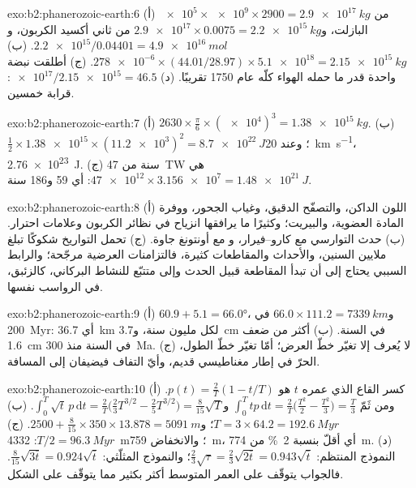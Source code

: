 \begin{solution}{exo:b2:phanerozoic-earth:6}
(أ) $\num{e5} \times \num{e9} \times 2900 = \qty{2.9e17}{kg}$ من البازلت، و$\num{2.9e17}
\times 0.0075 = \qty{2.2e15}{kg}$ من ثاني أكسيد الكربون، و$\num{2.2e15}/0.04401 = \qty{4.9e16}{mol}$.
(ب) $\num{278e-6} \times (44.01/28.97) \times \num{5.1e18} = \qty{2.15e15}{kg}$. (ج) أطلقت نبضة
واحدة قدر ما حمله الهواء كلّه عام 1750 تقريبًا. (د) $\num{e17}/\num{2.15e15} = 46.5$: قرابة خمسين.
\end{solution}

\begin{solution}{exo:b2:phanerozoic-earth:7}
(أ) $2630 \times \frac{\pi}{6} \times (\num{e4})^3 = \qty{1.38e15}{kg}$. (ب) $\tfrac12 \times
\num{1.38e15} \times (\num{11.2e3})^2 = \qty{8.7e22}{J}$؛ وعند \qty{20}{km.s^{-1}}،
\qty{2.76e23}{J}. (ج) سنة من \qty{47}{TW} هي $\num{47e12} \times \num{3.156e7} =
\qty{1.48e21}{J}$: أي 59 و186 سنة.
\end{solution}

\begin{solution}{exo:b2:phanerozoic-earth:8}
(أ) اللون الداكن، والتصفّح الدقيق، وغياب الجحور، ووفرة المادة العضوية، والبيريت؛ وكثيرًا ما يرافقها انزياح في
نظائر الكربون وعلامات احترار. (ب) حدث التوارسي مع كارو--فيرار، و مع
أونتونغ جاوة. (ج) تحمل التواريخ شكوكًا تبلغ ملايين السنين، والأحداث والمقاطعات
كثيرة، فالتزامنات العرضية مرجّحة؛ والرابط السببي يحتاج إلى أن تبدأ المقاطعة
قبيل الحدث وإلى متتبّع للنشاط البركاني، كالزئبق، في الرواسب نفسها.
\end{solution}

\begin{solution}{exo:b2:phanerozoic-earth:9}
(أ) $60.9 + 5.1 = \ang{66.0}$، و$66.0 \times 111.2 = \qty{7339}{km}$ في \qty{200}{Myr}:
أي \qty{36.7}{km} لكل مليون سنة، و\qty{3.7}{cm} في السنة. (ب) أكثر من ضعف
\qty{1.6}{cm} في السنة منذ \qty{300}{Ma}. (ج) لا يُعرف إلا تغيّر خطّ العرض؛ أمّا تغيّر
خطّ الطول، الحرّ في إطار مغناطيسي قديم، وأيّ التفاف فيضيفان إلى المسافة.
\end{solution}

\begin{solution}{exo:b2:phanerozoic-earth:10}
(أ) كسر القاع الذي عمره $t$ هو $p(t) = \frac2T(1 - t/T)$. ومن ثَمّ $\int_0^T tp\,\mathrm{d}t =
\frac2T\bigl(\frac{T^2}2 - \frac{T^2}3\bigr) = \frac T3$ و$\int_0^T \sqrt t\,p\,\mathrm{d}t =
\frac2T\bigl(\frac23 T^{3/2} - \frac25 T^{3/2}\bigr) = \frac8{15}\sqrt T$. (ب) $T = 3 \times 64.2 =
\qty{192.6}{Myr}$؛ و$2500 + \frac8{15} \times 350 \times 13.878 = \qty{5091}{m}$. (ج) $T/2 =
\qty{96.3}{Myr}$: \qty{4332}{m}؛ والانخفاض \qty{759}{m}، أي أقلّ بنسبة \qty{2}{\percent} من
\qty{774}{m}. (د) النموذج المنتظم: $\frac23\sqrt\tau = \frac23\sqrt{2\bar t} = 0.943\sqrt{\bar t}$؛
والنموذج المثلّثي: $\frac8{15}\sqrt{3\bar t} = 0.924\sqrt{\bar t}$. فالجواب يتوقّف على العمر المتوسط أكثر
بكثير مما يتوقّف على الشكل.
\end{solution}

